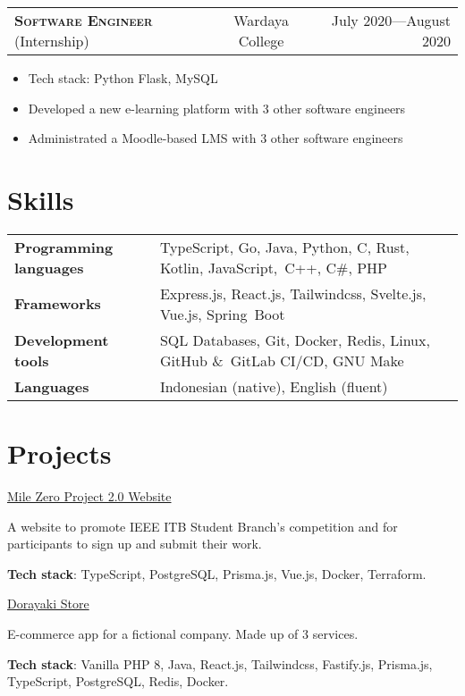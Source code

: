 \documentclass[10pt]{article}
\makeatletter
\newcommand{\workExpVspace}{0.5em}
\newcommand{\workExp}[6]{
    \noindent \begin{tabularx}{\textwidth}{@{}X c|r}
        \textbf{\textsc{#5}} (#2) & #1 & #3---#4
    \end{tabularx}

    {#6}
    \vspace{\workExpVspace}
}
\newcommand{\project}[3]{
    \noindent \href{#2}{#1}

    {#3}
}
\makeatother
\begin{document}
\workExp
    {Wardaya College}
    {Internship}
    {July 2020}
    {August 2020}
    {Software Engineer}
    {
        \begin{itemize}
            \item Tech stack: Python Flask, MySQL
            \item Developed a new e-learning platform with 3 other software engineers
            \item Administrated a Moodle-based LMS with 3 other software engineers
        \end{itemize}
    }

\section{Skills}

\begin{tabularx}{\textwidth}{@{}X l}
\textbf{Programming languages} & TypeScript, Go, Java, Python, C, Rust, Kotlin, JavaScript,\
                                 C++, C\#, PHP \\
\textbf{Frameworks}            & Express.js, React.js, Tailwindcss, Svelte.js, Vue.js, Spring\
                                 Boot \\
\textbf{Development tools}     & SQL Databases, Git, Docker, Redis, Linux, GitHub \&\
                                 GitLab CI/CD, GNU Make \\
\textbf{Languages}             & Indonesian (native), English (fluent)
\end{tabularx}

\section{Projects}

\project
    {Mile Zero Project 2.0 Website}
    {https://milezeroproject.com}
    {
        A website to promote IEEE ITB Student Branch’s competition and for participants to sign up and
        submit their work.

        \textbf{Tech stack}: TypeScript, PostgreSQL, Prisma.js, Vue.js, Docker, Terraform.
     }

\project
    {Dorayaki Store}
    {https://gitlab.informatika.org/if3110-2021-02-16}
    {
        E-commerce app for a fictional company. Made up of 3 services.

        \textbf{Tech stack}: Vanilla PHP 8, Java, React.js, Tailwindcss, Fastify.js, Prisma.js,
        TypeScript, PostgreSQL, Redis, Docker.
    }
\end{document}
